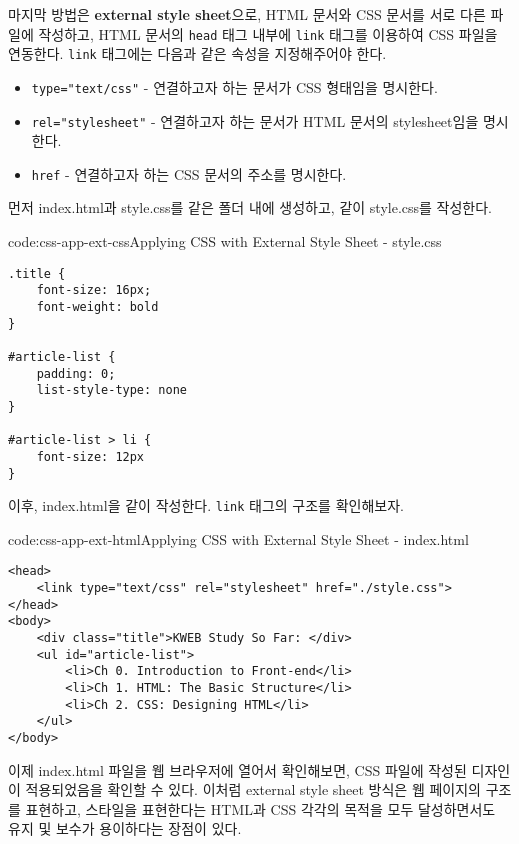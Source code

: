 마지막 방법은 \textbf{external style sheet}으로, HTML 문서와 CSS 문서를 서로 다른 파일에 작성하고, HTML 문서의 \texttt{head} 태그 내부에 \texttt{link} 태그를 이용하여 CSS 파일을 연동한다. \texttt{link} 태그에는 다음과 같은 속성을 지정해주어야 한다.

\begin{itemize}
    \item \texttt{type="text/css"} - 연결하고자 하는 문서가 CSS 형태임을 명시한다.
    \item \texttt{rel="stylesheet"} - 연결하고자 하는 문서가 HTML 문서의 stylesheet임을 명시한다.
    \item \texttt{href} - 연결하고자 하는 CSS 문서의 주소를 명시한다.
\end{itemize}

먼저 index.html과 style.css를 같은 폴더 내에 생성하고, \와 같이 style.css를 작성한다.

\begin{codeenv}{code:css-app-ext-css}{Applying CSS with External Style Sheet - style.css}\begin{verbatim}
.title {
    font-size: 16px;
    font-weight: bold
}

#article-list {
    padding: 0;
    list-style-type: none
}

#article-list > li {
    font-size: 12px
}
\end{verbatim}
\end{codeenv}

이후, index.html을 \과 같이 작성한다. \texttt{link} 태그의 구조를 확인해보자.

\begin{codeenv}{code:css-app-ext-html}{Applying CSS with External Style Sheet - index.html}\begin{verbatim}
<head>
    <link type="text/css" rel="stylesheet" href="./style.css">
</head>
<body>
    <div class="title">KWEB Study So Far: </div>
    <ul id="article-list">
        <li>Ch 0. Introduction to Front-end</li>
        <li>Ch 1. HTML: The Basic Structure</li>
        <li>Ch 2. CSS: Designing HTML</li>
    </ul>
</body>
\end{verbatim}
\end{codeenv}

이제 index.html 파일을 웹 브라우저에 열어서 확인해보면, CSS 파일에 작성된 디자인이 적용되었음을 확인할 수 있다. 이처럼 external style sheet 방식은 웹 페이지의 구조를 표현하고, 스타일을 표현한다는 HTML과 CSS 각각의 목적을 모두 달성하면서도 유지 및 보수가 용이하다는 장점이 있다.
